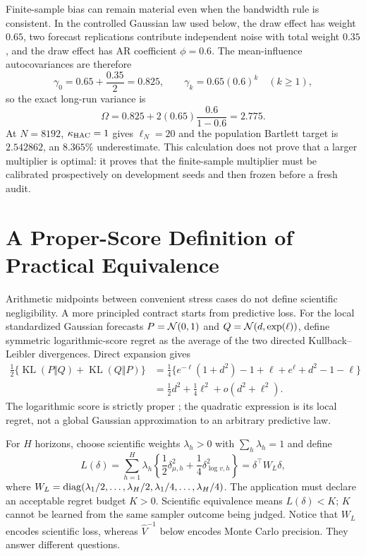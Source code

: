 Finite-sample bias can remain material even when the bandwidth rule is
consistent.  In the controlled Gaussian law used below, the draw effect has
weight $0.65$, two forecast replications contribute independent noise with
total weight $0.35$, and the draw effect has AR coefficient $\phi=0.6$.  The
mean-influence autocovariances are therefore
\begin{equation}
  \gamma_0=0.65+\frac{0.35}{2}=0.825,
  \qquad \gamma_k=0.65(0.6)^k\quad(k\geq1),
  \label{eq:bf-ssl-lstm-controlled-autocovariance}
\end{equation}
so the exact long-run variance is
\begin{equation}
  \Omega=0.825+2(0.65)\frac{0.6}{1-0.6}=2.775.
  \label{eq:bf-ssl-lstm-controlled-lrv}
\end{equation}
At $N=8192$, $\kappa_{\rm HAC}=1$ gives $\ell_N=20$ and the population
Bartlett target is $2.542862$, an $8.365\%$ underestimate.  This calculation
does not prove that a larger multiplier is optimal: it proves that the
finite-sample multiplier must be calibrated prospectively on development
seeds and then frozen before a fresh audit.

\section{A Proper-Score Definition of Practical Equivalence}
\label{sec:bf-ssl-lstm-proper-score-equivalence}

Arithmetic midpoints between convenient stress cases do not define scientific
negligibility.  A more principled contract starts from predictive loss.  For
the local standardized Gaussian forecasts
$P=\mathcal{N}(0,1)$ and $Q=\mathcal{N}(d,\exp(\ell))$, define symmetric logarithmic-score
regret as the average of the two directed Kullback--Leibler divergences.  Direct
expansion gives
\begin{align}
  \frac12\{\operatorname{KL}(P\Vert Q)+\operatorname{KL}(Q\Vert P)\}
  &=\frac14\{e^{-\ell}(1+d^2)-1+\ell
              +e^\ell+d^2-1-\ell\}                                      \\
  &=\frac12d^2+\frac14\ell^2
    +o(d^2+\ell^2).
  \label{eq:bf-ssl-lstm-local-score-regret}
\end{align}
The logarithmic score is strictly proper \citep{gneiting2007proper}; the
quadratic expression is its local regret, not a global Gaussian approximation
to an arbitrary predictive law.

For $H$ horizons, choose scientific weights $\lambda_h>0$ with
$\sum_h\lambda_h=1$ and define
\begin{equation}
  L(\delta)
  =\sum_{h=1}^H\lambda_h
    \left\{\frac12\delta_{\mu,h}^2
                 +\frac14\delta_{\log v,h}^2\right\}
  =\delta^\top W_L\delta,
  \label{eq:bf-ssl-lstm-scientific-loss}
\end{equation}
where
$W_L=\operatorname{diag}(\lambda_1/2,\ldots,\lambda_H/2,
           \lambda_1/4,\ldots,\lambda_H/4)$.
The application must declare an acceptable regret budget $K>0$.  Scientific
equivalence means $L(\delta)<K$; $K$ cannot be learned from the same sampler
outcome being judged.  Notice that $W_L$ encodes scientific loss, whereas
$\widehat V^{-1}$ below encodes Monte Carlo precision.  They answer different
questions.

